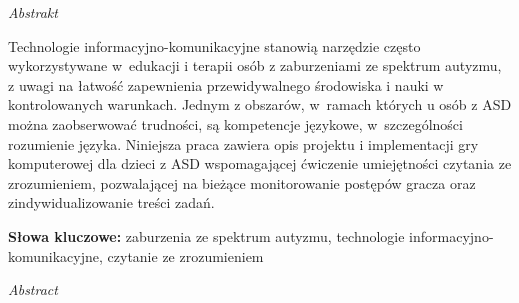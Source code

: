 \thispagestyle{firststyle}
{\centering\large
    {\Huge\emph{Abstrakt}\\}
    \vspace{0.5cm}
}

\sloppy
Technologie informacyjno-komunikacyjne stanowią narzędzie często wykorzystywane w~edukacji i terapii osób z zaburzeniami ze spektrum autyzmu, z uwagi na łatwość zapewnienia przewidywalnego środowiska i nauki w kontrolowanych warunkach.
Jednym z obszarów, w~ramach których u osób z ASD można zaobserwować trudności, są kompetencje językowe, w~szczególności rozumienie języka.
Niniejsza praca zawiera opis projektu i implementacji gry komputerowej dla dzieci z ASD wspomagającej ćwiczenie umiejętności czytania ze zrozumieniem, pozwalającej na bieżące monitorowanie postępów gracza oraz zindywidualizowanie treści zadań.

\vspace{1cm}
\noindent\textbf{Słowa kluczowe:}
zaburzenia ze spektrum autyzmu, technologie informacyjno-komunikacyjne, czytanie ze zrozumieniem

{\centering\large
    {\Huge\emph{Abstract}\\}
    \vspace{0.5cm}
}

